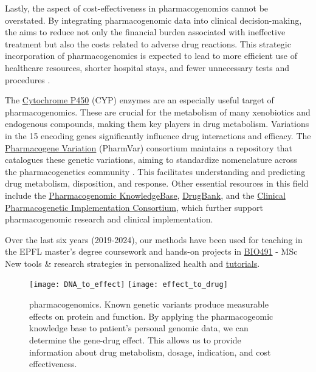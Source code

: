 Lastly, the aspect of cost-effectiveness in pharmacogenomics cannot be overstated. By integrating pharmacogenomic data into clinical decision-making, the \pmu aims to reduce not only the financial burden associated with ineffective treatment but also the costs related to adverse drug reactions. 
This strategic incorporation of pharmacogenomics is expected to lead to more efficient use of healthcare resources, shorter hospital stays, and fewer unnecessary tests and procedures \citep{relling2015pharmacogenomics}.

The \href{https://en.wikipedia.org/wiki/Cytochrome_P450}{Cytochrome P450} (CYP) enzymes are an especially useful target of pharmacogenomics.
These are crucial for the metabolism of many xenobiotics and endogenous compounds, making them key players in drug metabolism. 
Variations in the 15 encoding genes significantly influence drug interactions and efficacy. 
The \href{https://www.pharmvar.org}{Pharmacogene Variation} (PharmVar) consortium maintains a repository that catalogues these genetic variations, aiming to standardize nomenclature across the pharmacogenetics community
\citep{gaedigk2021pharmvar}. 
This facilitates understanding and predicting drug metabolism, disposition, and response. 
Other essential resources in this field include the 
\href{https://www.pharmgkb.org/}{Pharmacogenomic KnowledgeBase}, 
\href{https://go.drugbank.com}{DrugBank}, and 
the \href{https://cpicpgx.org/}{Clinical Pharmacogenetic Implementation Consortium}, which further support pharmacogenomic research and clinical implementation.

Over the last six years (2019-2024), our methods have been used for teaching in the EPFL master's degree coursework and hands-on projects in 
\href{https://edu.epfl.ch/coursebook/en/new-tools-research-strategies-in-personalized-health-BIO-491?cb_cycle=bama_cyclemaster&cb_section=sv}{BIO491} - MSc New tools \& research strategies in personalized health and 
\href{https://lawlessgenomics.com/topic/pharmacogenomics}{tutorials}.

\begin{figure}[h] \hspace*{-5cm} 
\begin{center}
	\texttt{[image: DNA\_to\_effect]}
	\texttt{[image: effect\_to\_drug]}
	\caption{\pmu pharmacogenomics. Known genetic variants produce measurable effects on protein and function. By applying the pharmacogeomic knowledge base to patient's personal genomic data, we can determine the gene-drug effect. This allows us to provide information about drug metabolism, dosage, indication, and cost effectiveness.}
	\label{fig:pharmacogenomic}
\end{center}
\end{figure}


